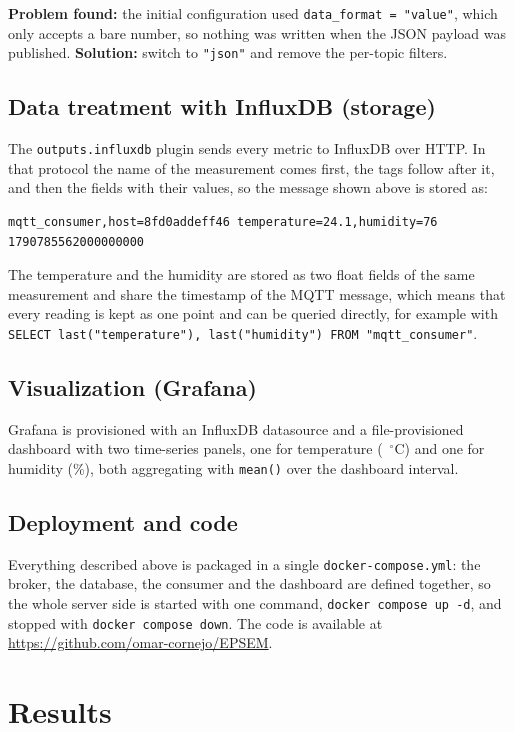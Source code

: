 \documentclass[11pt,a4paper]{article}
\begin{document}
\textbf{Problem found:} the initial configuration used \texttt{data\_format = "value"}, which
only accepts a bare number, so nothing was written when the JSON payload was published.
\textbf{Solution:} switch to \texttt{"json"} and remove the per-topic filters.

\subsection{Data treatment with InfluxDB (storage)}

The \texttt{outputs.influxdb} plugin sends every metric to InfluxDB over HTTP. In that protocol the name of the measurement comes first, the tags follow after it,
and then the fields with their values, so the message shown above is stored as:

\begin{lstlisting}
mqtt_consumer,host=8fd0addeff46 temperature=24.1,humidity=76 1790785562000000000
\end{lstlisting}

The temperature and the humidity are stored as two float fields of the same
measurement and share the timestamp of the MQTT message, which means that every reading is
kept as one point and can be queried directly, for example with
\texttt{SELECT last("temperature"), last("humidity") FROM "mqtt\_consumer"}.

\subsection{Visualization (Grafana)}

Grafana is provisioned with an InfluxDB datasource and a file-provisioned dashboard with two time-series
panels, one for temperature (~$^\circ$C) and one for humidity (\%), both aggregating with
\texttt{mean()} over the dashboard interval.

\subsection{Deployment and code}

Everything described above is packaged in a single \texttt{docker-compose.yml}: the broker,
the database, the consumer and the dashboard are defined together, so the whole server side
is started with one command, \texttt{docker compose up -d}, and stopped with
\texttt{docker compose down}. The code is available at
\url{https://github.com/omar-cornejo/EPSEM}.

\section{Results}
\end{document}
